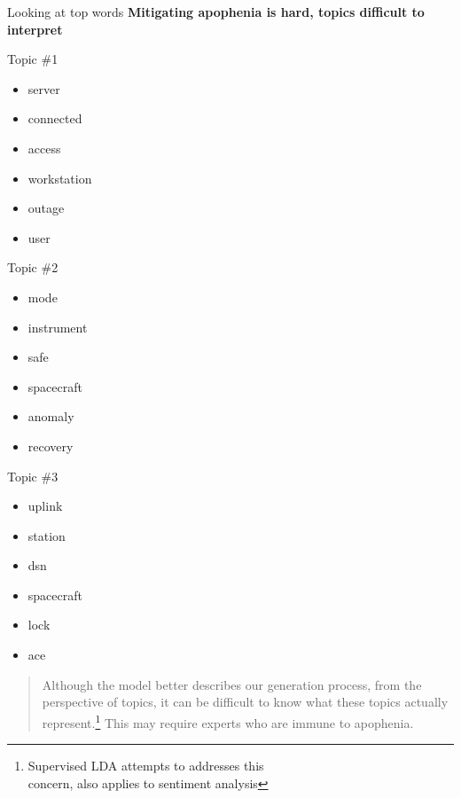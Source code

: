 \documentclass[10pt]{beamer}
\begin{document}
\begin{frame}{Looking at top words}
  {\bf Mitigating apophenia is hard, topics difficult to interpret}

  \begin{multicols}{3}
    Topic \#1
    \begin{itemize}
    \item server
    \item connected
    \item access
    \item workstation
    \item outage
    \item user
    \end{itemize}

    \columnbreak

    Topic \#2
    \begin{itemize}
    \item mode
    \item instrument
    \item safe
    \item spacecraft
    \item anomaly
    \item recovery
    \end{itemize}

    \columnbreak

    Topic \#3
    \begin{itemize}
    \item uplink
    \item station
    \item dsn
    \item spacecraft
    \item lock
    \item ace
    \end{itemize}

  \end{multicols}

  \begin{quote}
    Although the model better describes our generation process, from the perspective of topics, it can be difficult to know what these topics actually represent.\footnote{Supervised LDA attempts to addresses this\\ concern, also applies to sentiment analysis} This may require experts who are immune to apophenia.
  \end{quote}
\end{frame}
\end{document}
